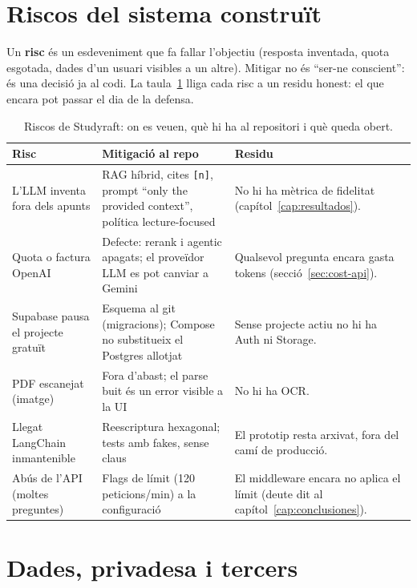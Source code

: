 \section{Riscos del sistema construït}

Un \textbf{risc} és un esdeveniment que fa fallar l'objectiu (resposta inventada, quota esgotada, dades d'un usuari visibles a un altre). Mitigar no és ``ser-ne conscient'': és una decisió ja al codi. La taula~\ref{tab:riesgos} lliga cada risc a un residu honest: el que encara pot passar el dia de la defensa.

\begin{table}[htbp]
\centering
\caption{Riscos de Studyraft: on es veuen, què hi ha al repositori i què queda obert.}
\label{tab:riesgos}
\small
\begin{tabularx}{\textwidth}{>{\raggedright\arraybackslash}p{2.7cm}>{\raggedright\arraybackslash}p{5.0cm}X}
\toprule
Risc & Mitigació al repo & Residu \\
\midrule
L'LLM inventa fora dels apunts
  & RAG híbrid, cites \texttt{[n]}, prompt ``only the provided context'', política lecture-focused
  & No hi ha mètrica de fidelitat (capítol~\ref{cap:resultados}). \\
Quota o factura OpenAI
  & Defecte: rerank i agentic apagats; el proveïdor LLM es pot canviar a Gemini
  & Qualsevol pregunta encara gasta tokens (secció~\ref{sec:cost-api}). \\
Supabase pausa el projecte gratuït
  & Esquema al git (migracions); Compose no substitueix el Postgres allotjat
  & Sense projecte actiu no hi ha Auth ni Storage. \\
PDF escanejat (imatge)
  & Fora d'abast; el parse buit és un error visible a la UI
  & No hi ha OCR. \\
Llegat LangChain inmantenible
  & Reescriptura hexagonal; tests amb fakes, sense claus
  & El prototip resta arxivat, fora del camí de producció. \\
Abús de l'API (moltes preguntes)
  & Flags de límit (120 peticions/min) a la configuració
  & El middleware encara no aplica el límit (deute dit al capítol~\ref{cap:conclusiones}). \\
\bottomrule
\end{tabularx}
\end{table}

\section{Dades, privadesa i tercers}

